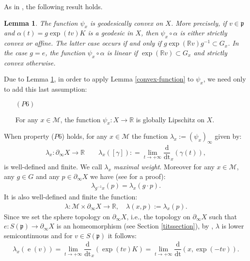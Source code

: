 \documentclass[leqno,11pt, a4]{amsart}
\newtheorem{lemma}[equation]{Lemma}
\theoremstyle{named}
\begin{document}
As in \cite{bgs}, the following result holds.
\begin{lemma}
  \label{convstab}
  The function $\psi_x$ is geodesically convex on $X$. More precisely,
  if ${{v}} \in {\mathfrak{p}}$ and ${\alpha}(t) = g \exp(t{{v}}) K$ is a geodesic in
  $X$, then $\psi_x \circ {\alpha}$ is either strictly convex or
  affine. The latter case occurs if and only if
  $ g \exp ({\mathbb{R}} {{v}}) g {^{-1}} \subset G_x$.  In the case $g=e$, the
  function $\psi_x \circ {\alpha}$ is linear if
  $ \exp ({\mathbb{R}} {{v}}) \subset G_x$ and strictly convex otherwise.
\end{lemma}

{Due to Lemma \ref{convstab},} in order to apply Lemma \ref{convex-function} to $\psi_x$, we need {only} to add this last assumption:

\begin{enumerate}
 \item[$(P6)$]
    
For any $x\in {\mathscr{M}}$, the function $\psi_x : X {\rightarrow} {\mathbb{R}}$ is globally Lipschitz on $X$.
 \end{enumerate}

When property ($P6$) holds, for any $x\in {\mathscr{M}}$ the function ${\lambda}_x:=(\psi_x)_\infty$ given by:
  \begin{gather}    {\lambda}_x : {\partial_\infty X} {\rightarrow} {\mathbb{R}} 
    \qquad {\lambda}_x ([{\gamma}]): = \lim_{t\to +\infty} {\dfrac {\mathrm {d}  }{\mathrm {dt}}}_x({\gamma}(t)),
  \end{gather}
  is well-defined and finite. We call ${\lambda}_x$ \emph{maximal weight}.
Moreover for any $x\in {\mathscr{M}}$, any $g\in G$ and any $p\in {\partial_\infty X}$ we have (see \cite[Lemma 2.28]{bgs} for a proof):
\begin{gather}\label{maximal-weight-Ginvariant}
\lambda_{g^{-1}x}(p)=\lambda_x (g\cdot p).
\end{gather}
It is also well-defined and finite the function:
  \begin{gather}
    \label{def-la}
    {\lambda} : {\mathscr{M}} \times {\partial_\infty X} {\longrightarrow} {\mathbb{R}} , \quad {\lambda}(x, p):= {\lambda}_x(p).
  \end{gather}
 Since we set the sphere topology on ${\partial_\infty X}$, i.e., the topology on ${\partial_\infty X}$ such that  $e:S({\mathfrak{p}}) {\rightarrow} {\partial_\infty X}$ is an homeomorphism {(see Section \ref{titssection}), by \cite[Lemma 4.9]{bgs}}, ${\lambda}$ is lower semicontinuous
and for
  $v\in S({\mathfrak{p}})$ it follows:
    \begin{gather}
      \label{la-exp}
      {\lambda}_x ({\operatorname{e}}(v)) = \lim_{t\to +\infty} {\dfrac {\mathrm {d}  }{\mathrm {dt}}}_x(\exp(tv)K) =
      \lim_{t\to +\infty} {\dfrac {\mathrm {d}  }{\mathrm {dt}}}(x, \exp(-tv)).
    \end{gather}
\end{document}
